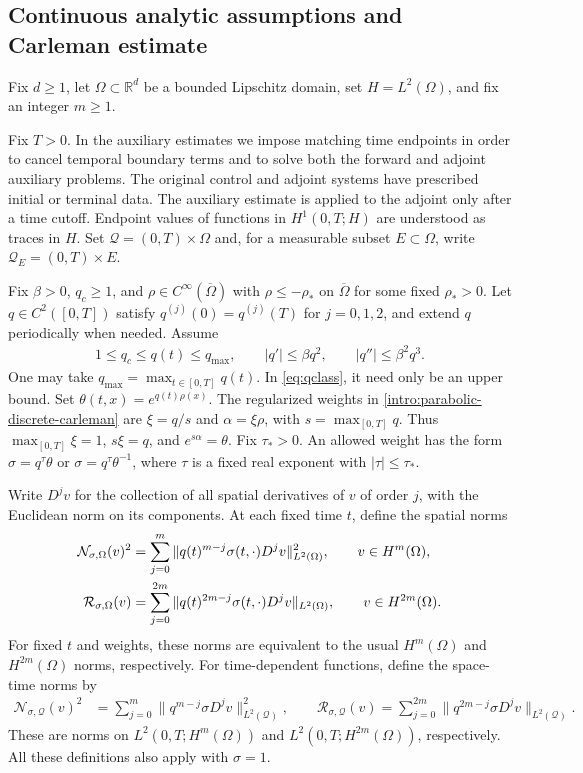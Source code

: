 \documentclass[print,wide,eng]{draft}
\begin{document}
\subsection{Continuous analytic assumptions and Carleman estimate}

Fix $d\geq1$, let $\Omega\subset\mathbb R^d$ be a bounded Lipschitz domain, set $H=L^2(\Omega)$, and fix an integer $m\geq1$.

Fix $T>0$. In the auxiliary estimates we impose matching time endpoints in order to cancel temporal boundary terms and to solve both the forward and adjoint auxiliary problems. The original control and adjoint systems have prescribed initial or terminal data. The auxiliary estimate is applied to the adjoint only after a time cutoff. Endpoint values of functions in $H^1(0,T;H)$ are understood as traces in $H$.
Set $\mathcal Q=(0,T)\times\Omega$ and, for a measurable subset $E\subset\Omega$, write $\mathcal Q_E=(0,T)\times E$.

Fix $\beta>0$, $q_c\geq1$, and $\rho\in C^\infty(\overline\Omega)$ with $\rho\leq-\rho_*$ on $\overline\Omega$ for some fixed $\rho_*>0$.
Let $q\in C^2([0,T])$ satisfy $q^{(j)}(0)=q^{(j)}(T)$ for $j=0,1,2$, and extend $q$ periodically when needed. Assume
%
\begin{align}\label{eq:qclass}
1\leq q_c\leq q(t)\leq q_{\max},\qquad |q'|\leq\beta q^2,
\qquad |q''|\leq\beta^2q^3.
\end{align}
%
One may take $q_{\max}=\max_{t\in[0,T]}q(t)$. In \cref{eq:qclass}, it need only be an upper bound.
Set $\theta(t,x)=e^{q(t)\rho(x)}$.
The regularized weights in \cref{intro:parabolic-discrete-carleman} are $\xi=q/s$ and $\alpha=\xi\rho$, with $s=\max_{[0,T]}q$. Thus $\max_{[0,T]}\xi=1$, $s\xi=q$, and $e^{s\alpha}=\theta$.
Fix $\tau_*>0$. An allowed weight has the form $\sigma=q^\tau\theta$ or $\sigma=q^\tau\theta^{-1}$, where $\tau$ is a fixed real exponent with $|\tau|\leq\tau_*$.

Write $D^jv$ for the collection of all spatial derivatives of $v$ of order $j$, with the Euclidean norm on its components. At each fixed time $t$, define the spatial norms
%
\begin{align}\label{eq:graphnorms}
\mathcal N_{\sigma,\Omega}(v)^2
&=\sum_{j=0}^m\|q(t)^{m-j}\sigma(t,\cdot)D^jv\|_{L^2(\Omega)}^2,
\qquad v\in H^m(\Omega),\notag\\
\mathcal R_{\sigma,\Omega}(v)
&=\sum_{j=0}^{2m}\|q(t)^{2m-j}\sigma(t,\cdot)D^jv\|_{L^2(\Omega)},
\qquad v\in H^{2m}(\Omega).
\end{align}
%
For fixed $t$ and weights, these norms are equivalent to the usual $H^m(\Omega)$ and $H^{2m}(\Omega)$ norms, respectively.
For time-dependent functions, define the space-time norms by
%
\begin{align}
\label{eq:spacetimegraphnorms}
\mathcal N_{\sigma,\mathcal Q}(v)^2
&=\sum_{j=0}^m\|q^{m-j}\sigma D^jv\|_{L^2(\mathcal Q)}^2,
\qquad
\mathcal R_{\sigma,\mathcal Q}(v)
=\sum_{j=0}^{2m}\|q^{2m-j}\sigma D^jv\|_{L^2(\mathcal Q)}.
\end{align}
%
These are norms on $L^2(0,T;H^m(\Omega))$ and $L^2(0,T;H^{2m}(\Omega))$, respectively.
All these definitions also apply with $\sigma=1$.
\end{document}
